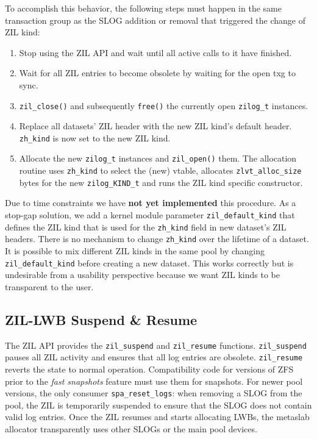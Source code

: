 \documentclass[12pt,a4paper,twoside]{book}
\begin{document}
To accomplish this behavior, the following steps must happen in the same transaction group as the SLOG addition or removal that triggered the change of ZIL kind:
\begin{enumerate}[noitemsep]
    \item Stop using the ZIL API and wait until all active calls to it have finished.
    \item Wait for all ZIL entries to become obsolete by waiting for the open txg to sync.
    \item \lstinline{zil_close()} and subsequently \lstinline{free()} the currently open \lstinline{zilog_t} instances.
    \item Replace all datasets' ZIL header with the new ZIL kind's default header.
        \lstinline{zh_kind} is now set to the new ZIL kind.
    \item Allocate the new \lstinline{zilog_t} instances and \lstinline{zil_open()} them.
        The allocation routine uses \lstinline{zh_kind} to select the (new) vtable, allocates \lstinline{zlvt_alloc_size} bytes for the new \lstinline{zilog_KIND_t} and runs the ZIL kind specific constructor.
\end{enumerate}
Due to time constraints we have \textbf{not yet implemented} this procedure.
As a stop-gap solution, we add a kernel module parameter \lstinline{zil_default_kind} that defines the ZIL kind that is used for the \lstinline{zh_kind} field in new dataset's ZIL headers.
There is no mechanism to change \lstinline{zh_kind} over the lifetime of a dataset.
It is possible to mix different ZIL kinds in the same pool by changing \lstinline{zil_default_kind} before creating a new dataset.
This works correctly but is undesirable from a usability perspective because we want ZIL kinds to be transparent to the user.

\subsection{ZIL-LWB Suspend \& Resume}\label{sec:zil_kinds:suspend_resume}
The ZIL API provides the \lstinline{zil_suspend} and \lstinline{zil_resume} functions.
\lstinline{zil_suspend} pauses all ZIL activity and ensures that all log entries are obsolete.
\lstinline{zil_resume} reverts the state to normal operation.
Compatibility code for versions of ZFS prior to the \textit{fast snapshots} feature must use them for snapshots.
For newer pool versions, the only consumer \lstinline{spa_reset_logs}: when removing a SLOG from the pool, the ZIL is temporarily suspended to ensure that the SLOG does not contain valid log entries.
Once the ZIL resumes and starts allocating LWBs, the metaslab allocator transparently uses other SLOGs or the main pool devices.
\end{document}
